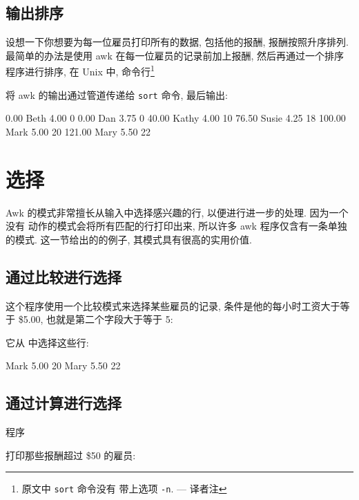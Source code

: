 \subsection{输出排序}
\label{subsec:sorting_the_output}

设想一下你想要为每一位雇员打印所有的数据, 包括他的报酬, 报酬按照升序排列.
最简单的办法是使用 awk 在每一位雇员的记录前加上报酬, 然后再通过一个排序
程序进行排序, 在 Unix 中, 命令行\footnote{原文中 \texttt{sort} 命令没有
带上选项 \texttt{-n}. --- 译者注}
将 awk 的输出通过管道传递给 \texttt{sort} 命令, 最后输出:
\begin{awkcode}
      0.00 Beth    4.00    0
      0.00 Dan     3.75    0
     40.00 Kathy   4.00    10
     76.50 Susie   4.25    18
    100.00 Mark    5.00    20
    121.00 Mary    5.50    22
\end{awkcode}

\section{选择}
\label{sec:selection}

Awk 的模式非常擅长从输入中选择感兴趣的行, 以便进行进一步的处理. 因为一个没有
动作的模式会将所有匹配的行打印出来, 所以许多 awk 程序仅含有一条单独的模式.
这一节给出的的例子, 其模式具有很高的实用价值.

\subsection{通过比较进行选择}
\label{subsec:selection_by_comparison}

这个程序使用一个比较模式来选择某些雇员的记录, 条件是他的每小时工资大于等于
\$5.00, 也就是第二个字段大于等于 5:
它从  中选择这些行:
\begin{awkcode}
    Mark    5.00    20
    Mary    5.50    22
\end{awkcode}

\subsection{通过计算进行选择}
\label{subsec:selection_by_computation}

程序
打印那些报酬超过 \$50 的雇员:

